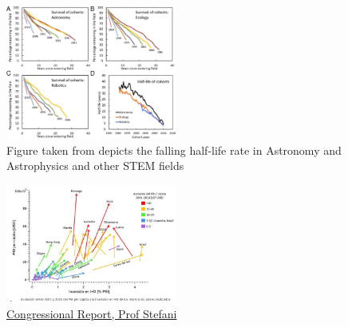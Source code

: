 \documentclass[final,5p,times,twocolumn,authoryear]{elsarticle}
\begin{document}
\begin{figure}[h!]
    \centering
  \caption{Figure taken from \cite{milo_2018} depicts the falling half-life rate in Astronomy and Astrophysics and other STEM fields}
  \label{fig:F4.large}
  \includegraphics[width=0.5\textwidth]{figs/F4.large.jpg}
\end{figure}

\begin{figure}
    \centering
    \includegraphics[width=0.5\textwidth]{figs/Docuemnto_Stefani_2.jpg}
    \caption{\href{https://aargentinapciencias.org/wp-content/uploads/2019/05/Docuemnto_Stefani.pdf}{Congressional Report, Prof Stefani}}
\end{figure}
\end{document}
